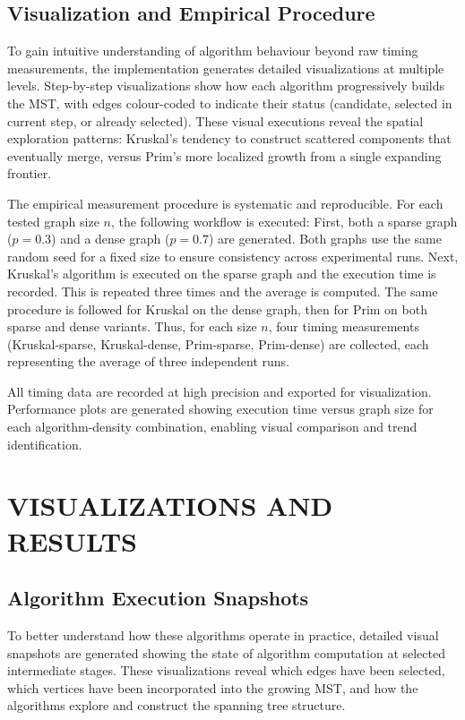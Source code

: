 ﻿\documentclass[12pt]{article}
\begin{document}
\subsection{Visualization and Empirical Procedure}

To gain intuitive understanding of algorithm behaviour beyond raw timing measurements, the implementation generates detailed visualizations at multiple levels. Step-by-step visualizations show how each algorithm progressively builds the MST, with edges colour-coded to indicate their status (candidate, selected in current step, or already selected). These visual executions reveal the spatial exploration patterns: Kruskal's tendency to construct scattered components that eventually merge, versus Prim's more localized growth from a single expanding frontier.

The empirical measurement procedure is systematic and reproducible. For each tested graph size $n$, the following workflow is executed: First, both a sparse graph ($p=0.3$) and a dense graph ($p=0.7$) are generated. Both graphs use the same random seed for a fixed size to ensure consistency across experimental runs. Next, Kruskal's algorithm is executed on the sparse graph and the execution time is recorded. This is repeated three times and the average is computed. The same procedure is followed for Kruskal on the dense graph, then for Prim on both sparse and dense variants. Thus, for each size $n$, four timing measurements (Kruskal-sparse, Kruskal-dense, Prim-sparse, Prim-dense) are collected, each representing the average of three independent runs.

All timing data are recorded at high precision and exported for visualization. Performance plots are generated showing execution time versus graph size for each algorithm-density combination, enabling visual comparison and trend identification.

\newpage
{}
\section{VISUALIZATIONS AND RESULTS}

\subsection{Algorithm Execution Snapshots}

To better understand how these algorithms operate in practice, detailed visual snapshots are generated showing the state of algorithm computation at selected intermediate stages. These visualizations reveal which edges have been selected, which vertices have been incorporated into the growing MST, and how the algorithms explore and construct the spanning tree structure.
\end{document}
